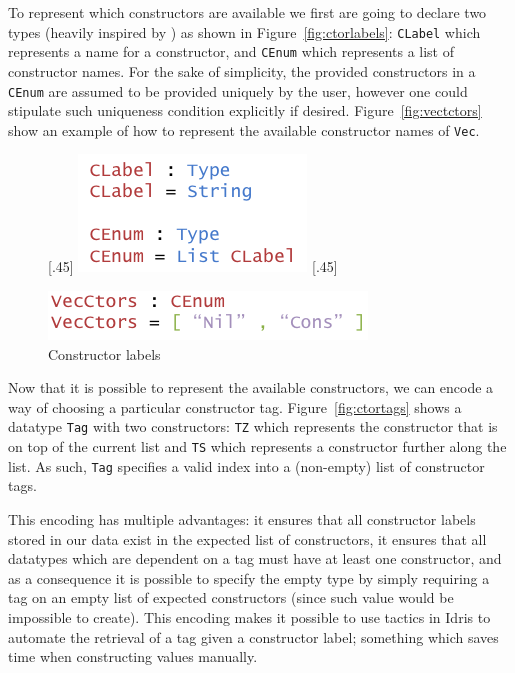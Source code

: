 \documentclass{ituthesis}
\newcommand{\ttconstructor}[1]{\textcolor{constructor-color}{\texttt{#1}}}
\newcommand{\tttype}[1]{\textcolor{type-color}{\texttt{#1}}}
\newcommand{\ttdec}[1]{\textcolor{declared-var-color}{\texttt{#1}}}
\theoremstyle{break}
\begin{document}
To represent which constructors are available we first are going to declare two types (heavily inspired by \textcite{Dagand2013acosmology,diehl2014eliminators}) as shown in Figure~\ref{fig:ctorlabels}: \ttdec{CLabel} which represents a name for a constructor, and \ttdec{CEnum} which
represents a list of constructor names. For the sake of simplicity, the provided constructors in a \ttdec{CEnum} are assumed to be provided uniquely by the user, however one could stipulate such uniqueness condition explicitly if desired.
Figure~\ref{fig:vectctors} show an example of how to represent the available constructor names of \tttype{Vec}.


\begin{figure}[ht]
\begin{center}
  [.45\textwidth]{
    \includegraphics[scale=0.5]{Figures/AnInformativeEncodingofConstructorsLabels.png}
}
[.45\textwidth]{
    \includegraphics[scale=0.5]{Figures/VectorConstructors.png}

}
\caption{Constructor labels}
\end{center}
\end{figure}

Now that it is possible to represent the available constructors, we can encode a way of choosing a particular constructor tag. Figure~\ref{fig:ctortags} shows a datatype \tttype{Tag} with two constructors:
\ttconstructor{TZ} which represents the constructor that is on top of the current list and \ttconstructor{TS} which represents a constructor further along the list. As such, \tttype{Tag} specifies a valid index into a (non-empty) list of constructor tags.

This encoding has multiple advantages: it ensures that all constructor labels stored in our data exist in the expected list of constructors, it ensures that all datatypes which are dependent on a tag must have at least one constructor, and as a consequence
it is possible to specify the empty type by simply requiring a tag on an empty list of expected constructors (since such value would be impossible to create).
This encoding makes it possible to use tactics in Idris to automate the retrieval of a tag given a constructor label; something which saves time when constructing
values manually.
\end{document}
